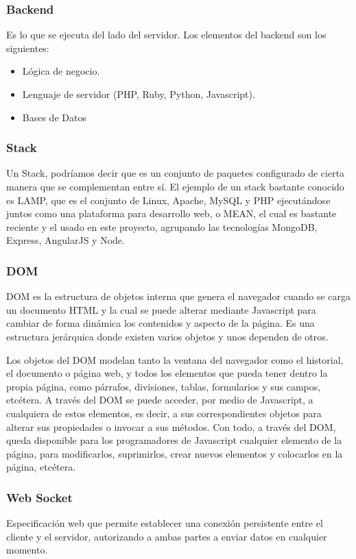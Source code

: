 \subsubsection{Backend}
Es lo que se ejecuta del lado del servidor. Los elementos del backend son los siguientes:

\begin{itemize}
\item Lógica de negocio.
\item Lenguaje de servidor (PHP, Ruby, Python, Javascript).
\item Bases de Datos
\end{itemize}

\subsubsection{Stack}
Un Stack, podríamos decir que es un conjunto de paquetes configurado de cierta manera que se complementan entre sí.
El ejemplo de un stack bastante conocido es LAMP, que es el conjunto de Linux, Apache, MySQL y PHP ejecutándose juntos como una plataforma para desarrollo web, o MEAN, el cual es bastante reciente y el usado en este proyecto, agrupando las tecnologías MongoDB, Express, AngularJS y Node.

\subsubsection{DOM}
\ac{DOM} es la estructura de objetos interna que genera el navegador cuando se carga un documento HTML y la cual se puede alterar mediante Javascript para cambiar de forma dinámica los contenidos y aspecto de la página. Es una estructura jerárquica donde existen varios objetos y unos dependen de otros.

Los objetos del DOM modelan tanto la ventana del navegador como el historial, el documento o página web, y todos los elementos que pueda tener dentro la propia página, como párrafos, divisiones, tablas, formularios y sus campos, etcétera. A través del DOM se puede acceder, por medio de Javascript, a cualquiera de estos elementos, es decir, a sus correspondientes objetos para alterar sus propiedades o invocar a sus métodos. Con todo, a través del DOM, queda disponible para los programadores de Javascript cualquier elemento de la página, para modificarlos, suprimirlos, crear nuevos elementos y colocarlos en la página, etcétera.

\subsubsection{Web Socket}
Especificación web que permite establecer una conexión persistente entre el cliente y el servidor, autorizando a ambas partes a enviar datos en cualquier momento.

